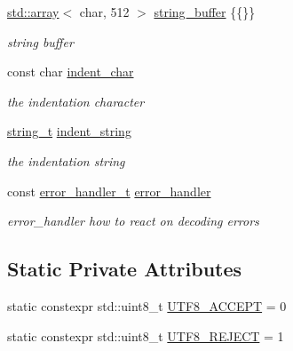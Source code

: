 \begin{DoxyCompactItemize}
\mbox{\hyperlink{namespacenlohmann_1_1detail_a1ed8fc6239da25abcaf681d30ace4985af1f713c9e000f5d3f280adbd124df4f5}{std\+::array}}$<$ char, 512 $>$ \mbox{\hyperlink{classnlohmann_1_1detail_1_1serializer_a9c9b7ca63a66e59e5e7ffe8a2acf5c8f}{string\+\_\+buffer}} \{\{\}\}
\begin{DoxyCompactList}\small\item\em string buffer \end{DoxyCompactList}\item 
const char \mbox{\hyperlink{classnlohmann_1_1detail_1_1serializer_a9a55e6b028d09676fe35aefa0c72ea5b}{indent\+\_\+char}}
\begin{DoxyCompactList}\small\item\em the indentation character \end{DoxyCompactList}\item 
\mbox{\hyperlink{classnlohmann_1_1detail_1_1serializer_ad08aa54fac1dd0a453320c54137d45ba}{string\+\_\+t}} \mbox{\hyperlink{classnlohmann_1_1detail_1_1serializer_ae9268a10d88a5526e32735a55a132fc6}{indent\+\_\+string}}
\begin{DoxyCompactList}\small\item\em the indentation string \end{DoxyCompactList}\item 
const \mbox{\hyperlink{namespacenlohmann_1_1detail_a5a76b60b26dc8c47256a996d18d967df}{error\+\_\+handler\+\_\+t}} \mbox{\hyperlink{classnlohmann_1_1detail_1_1serializer_a09d5a046fb0f7cb61977d6e5fbe8b3a1}{error\+\_\+handler}}
\begin{DoxyCompactList}\small\item\em error\+\_\+handler how to react on decoding errors \end{DoxyCompactList}\end{DoxyCompactItemize}
\subsection*{Static Private Attributes}
\begin{DoxyCompactItemize}
\item 
static constexpr std\+::uint8\+\_\+t \mbox{\hyperlink{classnlohmann_1_1detail_1_1serializer_a2311a8c756c4a119aa82cd55301d13bc}{U\+T\+F8\+\_\+\+A\+C\+C\+E\+PT}} = 0
\item 
static constexpr std\+::uint8\+\_\+t \mbox{\hyperlink{classnlohmann_1_1detail_1_1serializer_a833bd5805e4380549f4e21c304820d6d}{U\+T\+F8\+\_\+\+R\+E\+J\+E\+CT}} = 1
\end{DoxyCompactItemize}


